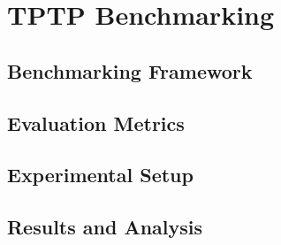 \chapter{TPTP Benchmarking}\label{chap:tptp-benchmarking}
\section{Benchmarking Framework}\label{sec:benchmarking-framework}
\section{Evaluation Metrics}\label{sec:evaluation-metrics}
\section{Experimental Setup}\label{sec:experimental-setup}
\section{Results and Analysis}\label{sec:results-analysis}


